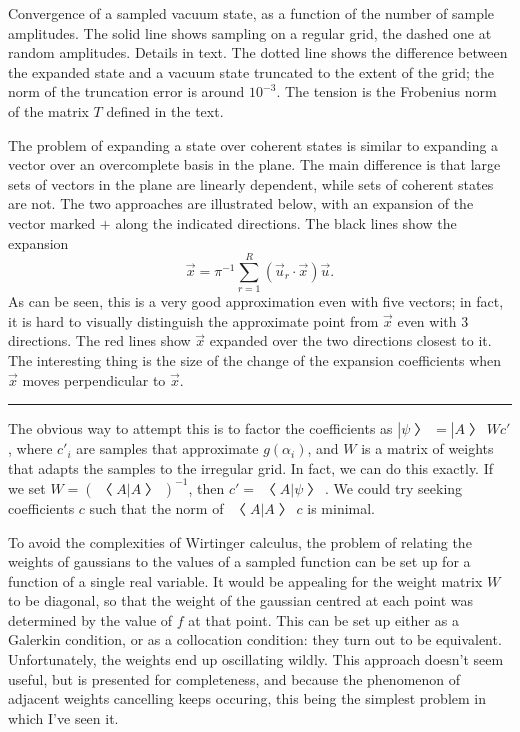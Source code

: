 Convergence of a sampled vacuum state, as a function of the number of sample amplitudes.  The solid line shows sampling on a regular grid, the dashed one at random amplitudes.  Details in text.  The dotted line shows the difference between the expanded state and a vacuum state truncated to the extent of the grid; the norm of the truncation error is around $10^{-3}$.  The tension is the Frobenius norm of the matrix $T$ defined in the text.

The problem of expanding a state over coherent states is similar to expanding a vector over an overcomplete basis in the plane.  The main difference is that large sets of vectors in the plane are linearly dependent, while sets of coherent states are not.  The two approaches are illustrated below, with an expansion of the vector marked $+$ along the indicated directions.  The black lines show the expansion
$$ \vec x = π^{-1}∑_{r=1}^R (\vec u_r\cdot\vec x)\vec u.$$
As can be seen, this is a very good approximation even with five vectors; in fact, it is hard to visually distinguish the approximate point from $\vec x$ even with 3 directions.  The red lines show $\vec x$ expanded over the two directions closest to it.  The interesting thing is the size of the change of the expansion coefficients when $\vec x$ moves perpendicular to $\vec x$.


\hrule

The obvious way to attempt this is to factor the coefficients as $|ψ〉=|A〉 Wc'$, where $c'_i$ are samples that approximate $g(α_i)$, and $W$ is a matrix of weights that adapts the samples to the irregular grid.  In fact, we can do this exactly.  If we set $W=(〈 A|A〉)^{-1}$, then $c'=〈 A|ψ〉$.  We could try seeking coefficients $c$ such that the norm of $〈 A|A〉 c$ is minimal.

To avoid the complexities of Wirtinger calculus, the problem of relating the weights of gaussians to the values of a sampled function can be set up for a function of a single real variable.  It would be appealing for the weight matrix $W$ to be diagonal, so that the weight of the gaussian centred at each point was determined by the value of $f$ at that point.  This can be set up either as a Galerkin condition, or as a collocation condition: they turn out to be equivalent.  Unfortunately, the weights end up oscillating wildly.  This approach doesn't seem useful, but is presented for completeness, and because the phenomenon of adjacent weights cancelling keeps occuring, this being the simplest problem in which I've seen it.

